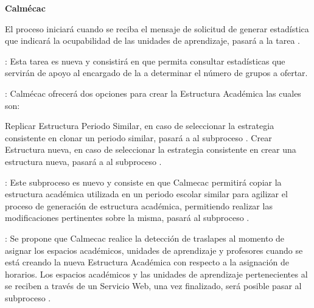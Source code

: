 \pagebreak
\begin{PDescripcion}
	
	\Ppaso \textbf{Calmécac}
	\begin{enumerate}
	
		\Ppaso[\Einicio]  El proceso iniciará cuando se reciba el mensaje de solicitud de generar estadística que indicará la ocupabilidad de las unidades de aprendizaje, pasará a la tarea  .

		\Ppaso [\itarea] : Esta tarea es nueva y consistirá en que  permita consultar  estadísticas que servirán de apoyo al encargado de la   a determinar el número de grupos a ofertar.
		
		\Ppaso [\itarea] : Calmécac ofrecerá dos opciones para crear la Estructura Académica las cuales son: \\
		\begin{Titemize}
			\Titem Replicar Estructura Periodo Similar, en caso de seleccionar la estrategia consistente en clonar un periodo similar, pasará a al subproceso .
			\Titem Crear Estructura nueva, en caso de seleccionar la estrategia consistente en crear una estructura nueva, pasará a al subproceso .
		\end{Titemize}	

		\Ppaso [\PSubProceso] :  Este subproceso es nuevo y consiste en que Calmecac permitirá copiar la estructura académica utilizada en un periodo escolar similar para agilizar el proceso de generación de estructura académica, permitiendo realizar las modificaciones pertinentes sobre la misma, pasará al subproceso . 
		
		\Ppaso [\PSubProceso]: Se propone que Calmecac realice la detección de traslapes al momento de asignar los espacios académicos, unidades de aprendizaje y profesores cuando se está creando la nueva Estructura Académica con respecto a la asignación de horarios. Los espacios académicos y las unidades de aprendizaje pertenecientes al  se reciben a través de un Servicio Web, una vez finalizado, será posible pasar al subproceso .
		

\end{enumerate}
\end{PDescripcion}
